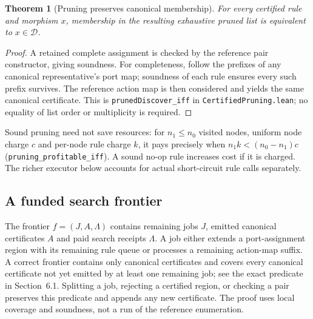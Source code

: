 \documentclass[10pt,letterpaper]{article}
\newtheorem{theorem}{Theorem}[section]
\newcommand{\CanonRef}{\mathcal D}
\newcommand{\rc}[1]{\texttt{#1}}
\begin{document}
\begin{theorem}[Pruning preserves canonical membership]\label{thm:prune}
For every certified rule and morphism $x$, membership in the resulting exhaustive pruned list is equivalent to $x\in\CanonRef$.
\end{theorem}
\begin{proof}
A retained complete assignment is checked by the reference pair constructor, giving soundness. For completeness, follow the prefixes of any canonical representative's port map; soundness of each rule ensures every such prefix survives. The reference action map is then considered and yields the same canonical certificate. This is \rc{prunedDiscover\_iff} in \rc{CertifiedPruning.lean}; no equality of list order or multiplicity is required.
\end{proof}
Sound pruning need not save resources: for $n_1\le n_0$ visited nodes, uniform node charge $c$ and per-node rule charge $k$, it pays precisely when $n_1 k<(n_0-n_1)c$ (\rc{pruning\_profitable\_iff}). A sound no-op rule increases cost if it is charged. The richer executor below accounts for actual short-circuit rule calls separately.

\subsection{A funded search frontier}
The frontier $f=(J,A,\Lambda)$ contains remaining jobs $J$, emitted canonical certificates $A$ and paid search receipts $\Lambda$. A job either extends a port-assignment region with its remaining rule queue or processes a remaining action-map suffix. A correct frontier contains only canonical certificates and covers every canonical certificate not yet emitted by at least one remaining job; see the exact predicate in Section~6.1. Splitting a job, rejecting a certified region, or checking a pair preserves this predicate and appends any new certificate. The proof uses local coverage and soundness, not a run of the reference enumeration.
\end{document}
